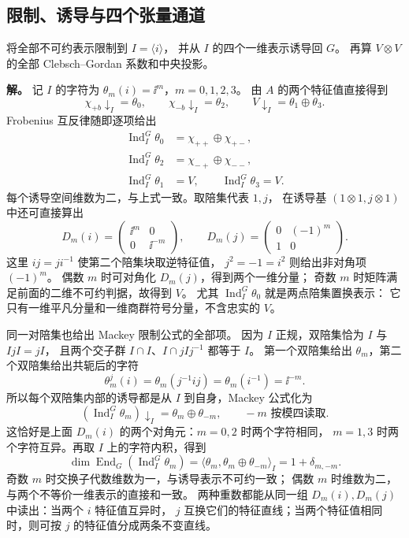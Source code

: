 \subsection{限制、诱导与四个张量通道}

\begin{exbox}[把子群表示与双粒子态接回同一张表]
将全部不可约表示限制到 $I=\langle i\rangle$，
并从 $I$ 的四个一维表示诱导回 $G$。
再算 $V\otimes V$ 的全部 Clebsch--Gordan 系数和中央投影。
\end{exbox}

\textbf{解。} 记 $I$ 的字符为 $\theta_m(i)=\ii^m$，$m=0,1,2,3$。
由 $A$ 的两个特征值直接得到
\[
\chi_{+b}\downarrow_I=\theta_0,
\qquad\chi_{-b}\downarrow_I=\theta_2,
\qquad V\downarrow_I=\theta_1\oplus\theta_3.
\]
Frobenius 互反律随即逐项给出
\[
\begin{aligned}
\operatorname{Ind}_I^G\theta_0&=\chi_{++}\oplus\chi_{+-},\\
\operatorname{Ind}_I^G\theta_2&=\chi_{-+}\oplus\chi_{--},\\
\operatorname{Ind}_I^G\theta_1&=V,
\qquad \operatorname{Ind}_I^G\theta_3=V.
\end{aligned}
\]
每个诱导空间维数为二，与上式一致。取陪集代表 $1,j$，
在诱导基 $(1\otimes1,j\otimes1)$ 中还可直接算出
\[
D_m(i)=\begin{pmatrix}\ii^m&0\\0&\ii^{-m}\end{pmatrix},
\qquad D_m(j)=\begin{pmatrix}0&(-1)^m\\1&0\end{pmatrix}.
\]
这里 $ij=ji^{-1}$ 使第二个陪集块取逆特征值，
$j^2=-1=i^2$ 则给出非对角项 $(-1)^m$。
偶数 $m$ 时可对角化 $D_m(j)$，得到两个一维分量；
奇数 $m$ 时矩阵满足前面的二维不可约判据，故得到 $V$。
尤其 $\operatorname{Ind}_I^G\theta_0$ 就是两点陪集置换表示：
它只有一维平凡分量和一维商群符号分量，不含忠实的 $V$。

同一对陪集也给出 Mackey 限制公式的全部项。
因为 $I$ 正规，双陪集恰为 $I$ 与 $IjI=jI$，
且两个交子群 $I\cap I$、$I\cap jIj^{-1}$ 都等于 $I$。
第一个双陪集给出 $\theta_m$，第二个双陪集给出共轭后的字符
\[
\theta_m^j(i)=\theta_m(j^{-1}ij)
=\theta_m(i^{-1})=\ii^{-m}.
\]
所以每个双陪集内部的诱导都是从 $I$ 到自身，Mackey 公式化为
\[
\left(\operatorname{Ind}_I^G\theta_m\right)\downarrow_I
=\theta_m\oplus\theta_{-m},
\qquad -m\text{ 按模四读取}.
\]
这恰好是上面 $D_m(i)$ 的两个对角元：$m=0,2$ 时两个字符相同，
$m=1,3$ 时两个字符互异。再取 $I$ 上的字符内积，得到
\[
\dim\operatorname{End}_G(\operatorname{Ind}_I^G\theta_m)
=\langle\theta_m,\theta_m\oplus\theta_{-m}\rangle_I
=1+\delta_{m,-m}.
\]
奇数 $m$ 时交换子代数维数为一，与诱导表示不可约一致；
偶数 $m$ 时维数为二，与两个不等价一维表示的直接和一致。
两种重数都能从同一组 $D_m(i),D_m(j)$ 中读出：当两个 $i$ 特征值互异时，
$j$ 互换它们的特征直线；当两个特征值相同时，则可按 $j$ 的特征值分成两条不变直线。

